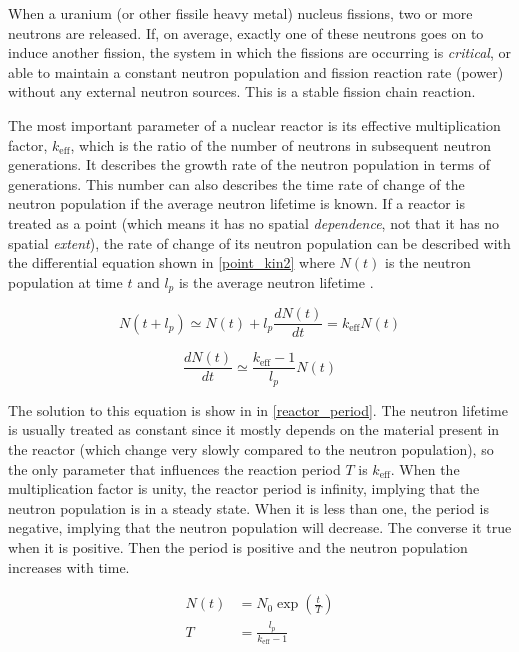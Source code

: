When a uranium (or other fissile heavy metal) nucleus fissions, two or more neutrons are released.  If, on average, exactly one of these neutrons goes on to induce another fission, the system in which the fissions are occurring is \emph{critical}, or able to maintain a constant neutron population and fission reaction rate (power) without any external neutron sources.  This is a stable fission chain reaction.

The most important parameter of a nuclear reactor is its effective multiplication factor, $k_\mathrm{eff}$, which is the ratio of the number of neutrons in subsequent neutron generations.  It describes the growth rate of the neutron population in terms of generations.  This number can also describes the time rate of change of the neutron population if the average neutron lifetime is known.  If a reactor is treated as a point (which means it has no spatial \emph{dependence}, not that it has no spatial \emph{extent}), the rate of change of its neutron population can be described with the differential equation shown in \eqref{point_kin2} where $N(t)$ is the neutron population at time $t$ and $l_p$ is the average neutron lifetime \cite{duderstadt}. 

\begin{equation}
\label{point_kin1}
N(t+l_p) \simeq N(t)+l_p \frac{dN(t)}{dt} = k_\mathrm{eff} N(t) 
\end{equation}

\begin{equation}
\label{point_kin2}
\frac{dN(t)}{dt} \simeq \frac{k_\mathrm{eff} -1}{l_p}N(t)
\end{equation}

The solution to this equation is show in in \eqref{reactor_period}.  The neutron lifetime is usually treated as constant since it mostly depends on the material present in the reactor (which change very slowly compared to the neutron population), so the only parameter that influences the reaction period $T$ is $k_\mathrm{eff}$.  When the multiplication factor is unity, the reactor period is infinity, implying that the neutron population is in a steady state.  When it is less than one, the period is negative, implying that the neutron population will decrease.  The converse it true when it is positive.  Then the period is positive and the neutron population increases with time.

\begin{equation}
\label{reactor_period}
\begin{split}
N(t) &= N_0 \exp \left( \frac{t}{T} \right) \\
T &= \frac{l_p}{k_\mathrm{eff} -1}
\end{split}
\end{equation}

